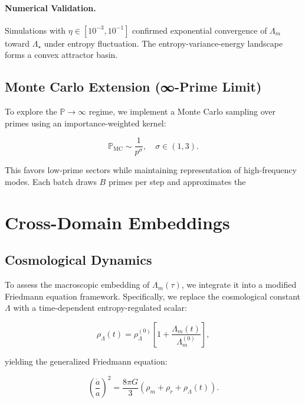 \documentclass{article}
\theoremstyle{plain}
\theoremstyle{claimstyle}
\begin{document}
\paragraph{Numerical Validation.} Simulations with $\eta \in [10^{-3}, 10^{-1}]$ confirmed exponential convergence of $\Lambda_m$ toward $\Lambda_\star$ under entropy fluctuation. The entropy-variance-energy landscape forms a convex attractor basin.

\subsection{Monte Carlo Extension (∞-Prime Limit)}

To explore the $\mathbb{P} \to \infty$ regime, we implement a Monte Carlo sampling over primes using an importance-weighted kernel:

\begin{equation}
\mathbb{P}_{\text{MC}} \sim \frac{1}{p^\sigma}, \quad \sigma \in (1, 3).
\end{equation}

This favors low-prime sectors while maintaining representation of high-frequency modes. Each batch draws $B$ primes per step and approximates the


\section{Cross-Domain Embeddings}

\subsection{Cosmological Dynamics}

To assess the macroscopic embedding of $\Lambda_m(\tau)$, we integrate it into a modified Friedmann equation framework. Specifically, we replace the cosmological constant $\Lambda$ with a time-dependent entropy-regulated scalar:

\begin{equation}
\rho_\Lambda(t) = \rho_{\Lambda}^{(0)} \left[ 1 + \frac{\Lambda_m(t)}{\Lambda_m^{(0)}} \right],
\end{equation}

yielding the generalized Friedmann equation:

\begin{equation}
\left( \frac{\dot{a}}{a} \right)^2 = \frac{8\pi G}{3} \left( \rho_m + \rho_r + \rho_\Lambda(t) \right).
\end{equation}
\end{document}
